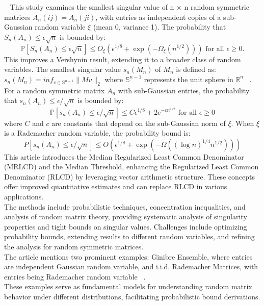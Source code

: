 \newpage~\cite{jain2020smallest} 
This study examines the smallest singular value of n $\times$ n random symmetric matrices $A_n(ij) = A_n(ji)$, with entries as independent copies of a sub-Gaussian random variable $\xi$ (mean 0, variance 1).
The probability that $S_n(A_n) \leq \epsilon\sqrt{n}$ is bounded by:
\begin{equation*}
    \mathbb{P}[S_n(A_n) \leq \epsilon \sqrt{n}] \leq O_\xi(\epsilon^{1/8} + \exp(-\Omega_\xi(n^{1/2}))) \text{ for all } \epsilon \geq 0.
\end{equation*}
This improves a Vershynin result, extending it to a broader class of random variables.
The smallest singular value $s_n(M_n)$ of $M_n$ is defined as: $s_n(M_n) = inf_{v \in \mathbb{S}^{n-1}} \|Mv\|_2$
where $\mathbb{S}^{n-1}$ represents the unit sphere in $\mathbb{R}^n$ ~\cite{rudelson2008littlewood}.
For a random symmetric matrix $A_n$ with sub-Gaussian entries, the probability that $s_n(A_n) \leq \epsilon/\sqrt{n}$ is bounded by:
\begin{equation*}
    \mathbb{P}[s_n(A_n)\leq \epsilon/\sqrt{n}]\leq C \epsilon^{1/8}+2e^{-c n^{1/2}} \text{ for all } \epsilon \geq 0
\end{equation*}
where $C$ and $c$ are constants that depend on the sub-Gaussian norm of $\xi$.
When $\xi$ is a Rademacher random variable, the probability bound is:
\begin{equation*}
    P[s_n(A_n) \leq \epsilon / \sqrt{n}] \leq O(\epsilon^{1/8}+ \exp(-\Omega((\log{n})^{1/4}n^{1/2})))
\end{equation*}
This article introduces the Median Regularized Least Common Denominator (MRLCD) and the Median Threshold, enhancing the Regularized Least Common Denominator (RLCD) by leveraging vector arithmetic structure.
These concepts offer improved quantitative estimates and can replace RLCD in various applications.\\
The methods include probabilistic techniques, concentration inequalities, and analysis of random matrix theory, providing systematic analysis of singularity properties and tight bounds on singular values.
Challenges include optimizing probability bounds, extending results to different random variables, and refining the analysis for random symmetric matrices.\\
The article mentions two prominent examples: Ginibre Ensemble, where entries are independent Gaussian random variable, and i.i.d. Rademacher Matrices, with entries being Rademacher random variable ~\cite{bourgain2010singularity}.\\
These examples serve as fundamental models for understanding random matrix behavior under different distributions, facilitating probabilistic bound derivations.